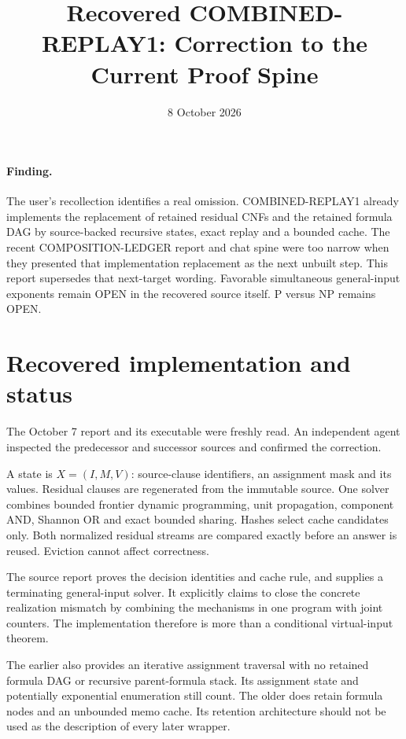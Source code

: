 \documentclass[11pt]{article}
\title{Recovered COMBINED-REPLAY1: Correction to the Current Proof Spine}
\date{8 October 2026}
\begin{document}
\maketitle
\paragraph{Finding.}
The user's recollection identifies a real omission. COMBINED-REPLAY1 already
implements the replacement of retained residual CNFs and the retained formula
DAG by source-backed recursive states, exact replay and a bounded cache.
The recent COMPOSITION-LEDGER report and chat spine were too narrow when
they presented that implementation replacement as the next unbuilt step.
This report supersedes that next-target wording. Favorable simultaneous
general-input exponents remain OPEN in the recovered source itself.
P versus NP remains OPEN.

\section{Recovered implementation and status}
The October 7 report
and its executable
were freshly read. An independent agent inspected the predecessor and
successor sources and confirmed the correction.

A state is $X=(I,M,V)$: source-clause identifiers, an assignment mask and its
values. Residual clauses are regenerated from the immutable source.
One solver combines bounded frontier dynamic programming, unit propagation,
component AND, Shannon OR and exact bounded sharing. Hashes select cache
candidates only. Both normalized residual streams are compared exactly
before an answer is reused. Eviction cannot affect correctness.

The source report proves the decision identities and cache rule, and supplies
a terminating general-input solver. It explicitly claims to close the
concrete realization mismatch by combining the mechanisms in one program
with joint counters. The implementation therefore is more than a conditional
virtual-input theorem.

The earlier 
also provides an iterative assignment traversal with no retained formula
DAG or recursive parent-formula stack. Its assignment state and potentially
exponential enumeration still count. The older
 does retain
formula nodes and an unbounded memo cache. Its retention architecture should
not be used as the description of every later wrapper.
\end{document}
